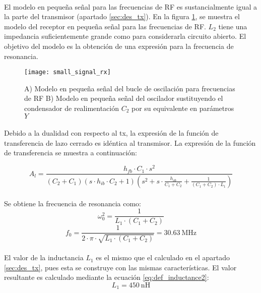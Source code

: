 \paragraph{}
El modelo en pequeña señal para las frecuencias de RF es sustancialmente igual a la parte del transmisor (apartado \ref{sec:des_tx}). En la figura \ref{fig:ss_rx}, se muestra el modelo del receptor en pequeña señal para las frecuencias de RF. $L_2$ tiene una impedancia suficientemente grande como para considerarla circuito abierto. El objetivo del modelo es la obtención de una expresión para la frecuencia de resonancia.

\begin{figure}[h]
    \centering
    \texttt{[image: small\_signal\_rx]}
    \caption{A) Modelo en pequeña señal del bucle de oscilación para frecuencias de RF B) Modelo en pequeña señal del oscilador sustituyendo el condensador de realimentación $C_2$ por su equivalente en parámetros $Y$}
    \label{fig:ss_rx}
\end{figure}

\paragraph{}
Debido a la dualidad con respecto al tx, la expresión de la función de transferencia de lazo cerrado es idéntica al transmisor. La expresi\'on de la funci\'on de transferencia se muestra a continuaci\'on:

\begin{equation}
   \label{eq:Al_tx}
   A_l = \frac{h_{fb} \cdot C_1 \cdot s^2}{ \left( C_2+C_1 \right) \left( s \cdot h_{ib} \cdot C_2 + 1\right) \left( s^2 + s \cdot \frac{h_{ob}}{C_1 + C_2} + \frac{1}{(C_1 + C_2)\cdot L_1}\right) }
\end{equation}

\paragraph{}
Se obtiene la frecuencia de resonancia como: $$\omega_0^2 = \frac{1}{L_1 \cdot (C_1 + C_2)}$$
$$ f_0 = \frac{1}{2 \cdot \pi \cdot \sqrt{L_1 \cdot (C_1 + C_2)}} = \SI{30.63}{\mega\hertz} $$
\paragraph{}
El valor de la inductancia $L_1$ es el mismo que el calculado en el apartado \ref{sec:des_tx}, pues esta se construye con las mismas caracter\'isticas. El valor resultante es calculado mediante la ecuaci\'on \ref{eq:def_inductance2}:
$$ L_1 = \SI{450}{\nano\henry} $$


